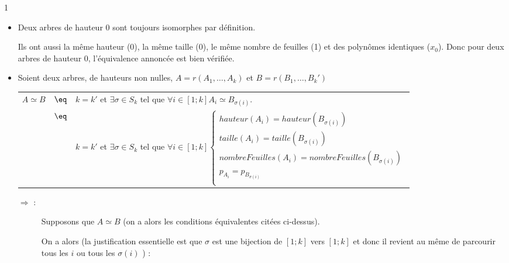 1\documentclass[a4paper, 11pt,french]{article}
\begin{document}
\begin{itemize}
\item Deux arbres de hauteur 0 sont toujours isomorphes par définition.

  Ils ont aussi la même hauteur (0), la même taille (0), le même nombre de feuilles (1) et des polynômes identiques ($x_0$).
  Donc pour deux arbres de hauteur 0, l'équivalence annoncée est bien vérifiée.
\item Soient deux arbres, de hauteurs non nulles, $A=r(A_1,\ldots,A_k)$ et $B=r(B_1,\ldots,B_k')$

  \begin{tabular}{rcl}
    $A\simeq B$ &$\eq$& $k=k'$ et $\exists \sigma \in S_k$ tel que $\forall i\in[1;k] A_i\simeq B_{\sigma(i)}$. \\
    &$\eq$&
    $k=k'$ et $\exists \sigma \in S_k$ tel que $\forall i\in[1;k]
    \left\{\begin{array}{l}
    hauteur( A_i )=hauteur( B_{\sigma(i)} )\\
    taille( A_i )=taille( B_{\sigma(i)} )\\
    nombreFeuilles( A_i )=nombreFeuilles( B_{\sigma(i)} )\\
    p_{A_i}=p_{B_{\sigma(i)}} \\
    \end{array}\right.$
  \end{tabular}

  \begin{description}
  \item[$\Rightarrow$ :] Supposons que $A\simeq B$ (on a alors les conditions équivalentes citées ci-dessus).

    On a alors (la justification essentielle est que $\sigma$ est une bijection de $[1;k]$ vers $[1;k]$ et donc il revient au même de parcourir tous les $i$ ou tous les $\sigma(i)$ ) :


\end{description}
\end{itemize}
\end{document}
